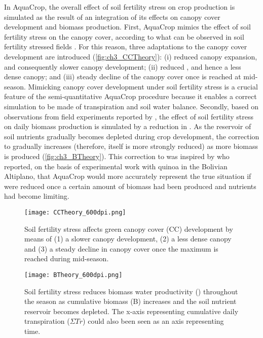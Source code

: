 In AquaCrop, the overall effect of soil fertility stress on crop production is simulated as the result of an integration of its effects on canopy cover development and biomass production.  First, AquaCrop mimics the effect of soil fertility stress on the canopy cover, according to what can be observed in soil fertility stressed fields \parencite{walburg1981,albrizio2005}. For this reason, three adaptations to the canopy cover development are introduced (\autoref{fig:ch3_CCTheory}): (i) reduced canopy expansion, and consequently slower canopy development; (ii) reduced \CCx, and hence a less dense canopy; and (iii) steady decline of the canopy cover once \CCx is reached at mid-season. Mimicking canopy cover development under soil fertility stress is a crucial feature of the semi-quantitative AquaCrop procedure because it enables a correct simulation to be made of transpiration and soil water balance. Secondly, based on observations from field experiments reported by \textcite{steduto2005}, the effect of soil fertility stress on daily biomass production is simulated by a reduction in \WPster. As the reservoir of soil nutrients gradually becomes depleted during crop development, the correction to \WPster gradually increases (therefore, \WPster itself is more strongly reduced) as more biomass is produced (\autoref{fig:ch3_BTheory}). This correction to \WPster was inspired by \textcite{geerts2008b} who reported, on the basis of experimental work with quinoa in the Bolivian Altiplano, that AquaCrop would more accurately represent the true situation if \WPster were reduced once a certain amount of biomass had been produced and nutrients had become limiting. 

\begin{figure}[tbhp]
	\centering
		\texttt{[image: CCTheory\_600dpi.png]}
	\caption{Soil fertility stress affects green canopy cover (CC) development by means of (1) a slower canopy development, (2) a less dense canopy and (3) a steady decline in canopy cover once the maximum is reached during mid-season.}
	\label{fig:ch3_CCTheory}
\end{figure}

\begin{figure}[tbhp]
	\centering
		\texttt{[image: BTheory\_600dpi.png]}
	\caption{Soil fertility stress reduces biomass water productivity (\WPster) throughout the season as cumulative biomass (B) increases and the soil nutrient reservoir becomes depleted. The x-axis representing cumulative daily transpiration ($\Sigma Tr$) could also been seen as an axis representing time.}
	\label{fig:ch3_BTheory}
\end{figure}

